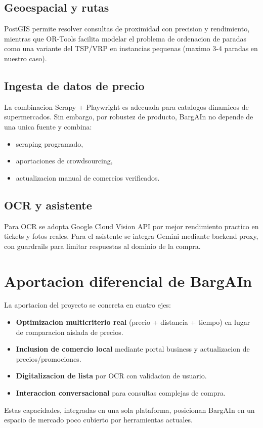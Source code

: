 \subsection{Geoespacial y rutas}

PostGIS permite resolver consultas de proximidad con precision y rendimiento, mientras que
OR-Tools facilita modelar el problema de ordenacion de paradas como una variante del TSP/VRP
en instancias pequenas (maximo 3-4 paradas en nuestro caso).

\subsection{Ingesta de datos de precio}

La combinacion Scrapy + Playwright es adecuada para catalogos dinamicos de supermercados.
Sin embargo, por robustez de producto, BargAIn no depende de una unica fuente y combina:

\begin{itemize}
	\item scraping programado,
	\item aportaciones de crowdsourcing,
	\item actualizacion manual de comercios verificados.
\end{itemize}

\subsection{OCR y asistente}

Para OCR se adopta Google Cloud Vision API por mejor rendimiento practico en tickets
y fotos reales. Para el asistente se integra Gemini mediante backend proxy, con
guardrails para limitar respuestas al dominio de la compra.

\section{Aportacion diferencial de BargAIn}

La aportacion del proyecto se concreta en cuatro ejes:

\begin{itemize}
	\item \textbf{Optimizacion multicriterio real} (precio + distancia + tiempo) en lugar de
		comparacion aislada de precios.
	\item \textbf{Inclusion de comercio local} mediante portal business y actualizacion de
		precios/promociones.
	\item \textbf{Digitalizacion de lista} por OCR con validacion de usuario.
	\item \textbf{Interaccion conversacional} para consultas complejas de compra.
\end{itemize}

Estas capacidades, integradas en una sola plataforma, posicionan BargAIn en un espacio
de mercado poco cubierto por herramientas actuales.
